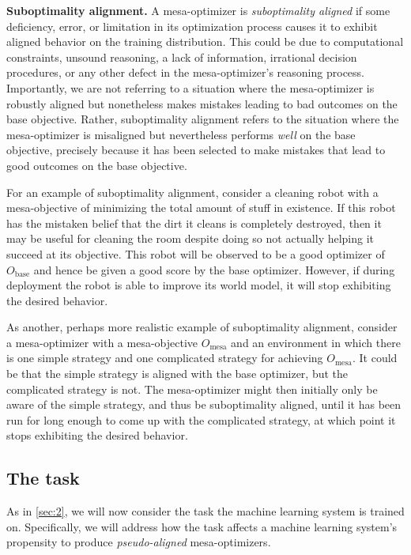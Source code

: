 \documentclass[
  onecolumn,
  natbib,
]{miri-tech-article}
\begin{document}
\textbf{Suboptimality alignment.} A mesa-optimizer is \textit{suboptimality aligned} if some deficiency, error, or limitation in its optimization process causes it to exhibit aligned behavior on the training distribution. This could be due to computational constraints, unsound reasoning, a lack of information, irrational decision procedures, or any other defect in the mesa-optimizer's reasoning process. Importantly, we are not referring to a situation where the mesa-optimizer is robustly aligned but nonetheless makes mistakes leading to bad outcomes on the base objective. Rather, suboptimality alignment refers to the situation where the mesa-optimizer is misaligned but nevertheless performs \textit{well} on the base objective, precisely because it has been selected to make mistakes that lead to good outcomes on the base objective.

For an example of suboptimality alignment, consider a cleaning robot with a mesa-objective of minimizing the total amount of stuff in existence. If this robot has the mistaken belief that the dirt it cleans is completely destroyed, then it may be useful for cleaning the room despite doing so not actually helping it succeed at its objective. This robot will be observed to be a good optimizer of $O_\text{base}$ and hence be given a good score by the base optimizer. However, if during deployment the robot is able to improve its world model, it will stop exhibiting the desired behavior.

As another, perhaps more realistic example of suboptimality alignment, consider a mesa-optimizer with a mesa-objective $O_\text{mesa}$ and an environment in which there is one simple strategy and one complicated strategy for achieving $O_\text{mesa}$. It could be that the simple strategy is aligned with the base optimizer, but the complicated strategy is not. The mesa-optimizer might then initially only be aware of the simple strategy, and thus be suboptimality aligned, until it has been run for long enough to come up with the complicated strategy, at which point it stops exhibiting the desired behavior.

\subsection{The task}
\label{sec:3.2}

As in \cref{sec:2}, we will now consider the task the machine learning system is trained on. Specifically, we will address how the task affects a machine learning system's propensity to produce \textit{pseudo-aligned} mesa-optimizers.
\end{document}

